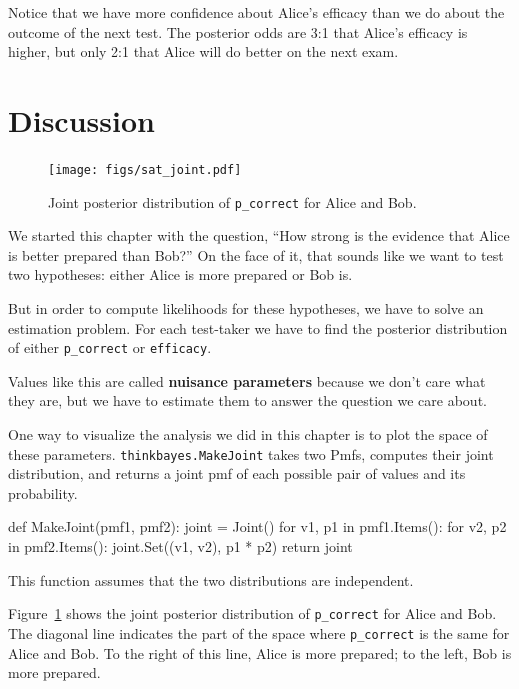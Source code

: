 \documentclass[12pt]{book}
\theoremstyle{exercise}
\begin{document}
Notice that we have more confidence about Alice's efficacy than we do
about the outcome of the next test.  The posterior odds are 3:1 that
Alice's efficacy is higher, but only 2:1 that Alice will do better on
the next exam.


\section{Discussion}

\begin{figure}
\centerline{\texttt{[image: figs/sat\_joint.pdf]}}
\caption{Joint posterior distribution of {\tt p\_correct} for Alice and Bob.}
\label{fig.satjoint}
\end{figure}

We started this chapter with the question,
``How strong is the evidence that Alice is better prepared
than Bob?''  On the face of it, that sounds like we want to
test two hypotheses: either Alice is more prepared or Bob is.

But in order to compute likelihoods for these hypotheses, we
have to solve an estimation problem.  For each test-taker
we have to find the posterior distribution of either
\verb"p_correct" or \verb"efficacy".

Values like this are called {\bf nuisance parameters} because
we don't care what they are, but we have
to estimate them to answer the question we care about.

One way to visualize the analysis we did in this chapter is
to plot the space of these parameters.  \verb"thinkbayes.MakeJoint"
takes two Pmfs, computes their joint distribution, and returns
a joint pmf of each possible pair of values and its probability.

\begin{code}
def MakeJoint(pmf1, pmf2):
    joint = Joint()
    for v1, p1 in pmf1.Items():
        for v2, p2 in pmf2.Items():
            joint.Set((v1, v2), p1 * p2)
    return joint
\end{code}

This function assumes that the two distributions are independent.

Figure~\ref{fig.satjoint} shows the joint posterior distribution of
\verb"p_correct" for Alice and Bob.  The diagonal line indicates the
part of the space where \verb"p_correct" is the same for Alice and
Bob.  To the right of this line, Alice is more prepared; to the left,
Bob is more prepared.
\end{document}
